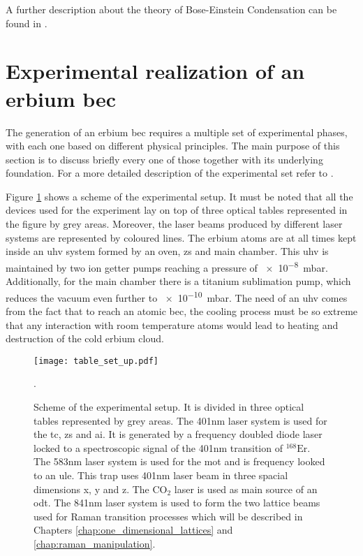 A further description about the theory of Bose-Einstein Condensation can be found in \cite{Masahito2010, Pethick2008}.

\section{Experimental realization of an erbium \ac{bec}} \label{sec:experimental_preparation}

The generation of an erbium \ac{bec} requires a multiple set of experimental phases, with each one based on different physical principles. The main purpose of this section is to discuss briefly every one of those together with its underlying foundation. For a more detailed description of the experimental set refer to  \cite{Ulitzsch2016}. 

Figure \ref{fig:table_set_up} shows a scheme of the experimental setup. It must be noted that all the devices used for the experiment lay on top of three optical tables represented in the figure by grey areas. Moreover, the laser beams produced by different laser systems are represented by coloured lines. The erbium atoms are at all times kept inside an \ac{uhv} system formed by an oven, \ac{zs} and main chamber. This \ac{uhv} is maintained by two ion getter pumps reaching a pressure of \SI{e-8}{\milli\bar}. Additionally, for the main chamber there is a titanium sublimation pump, which reduces the vacuum even further to \SI{e-10}{\milli\bar}. The need of an \ac{uhv} comes from the fact that to reach an atomic \ac{bec}, the cooling process must be so extreme that any interaction with room temperature atoms would lead to heating and destruction of the cold erbium cloud.


\begin{figure}[!htbp]\centering
	\texttt{[image: table\_set\_up.pdf]}
	\caption[Scheme of the experimental setup]{Scheme of the experimental setup. It is divided in three optical tables represented by grey areas. The 401nm laser system is used for the \acf{tc}, \acf{zs} and \acf{ai}. It is generated by a frequency doubled diode laser locked to a spectroscopic signal of the 401nm transition of $^{\text{168}}\text{Er}$. The 583nm laser system is used for the \acf{mot} and is frequency looked to an \acf{ule}. This trap uses 401nm laser beam in three spacial dimensions x, y and z. The $\text{CO}_{2}$ laser is used as main source of an \acf{odt}. The 841nm laser system is used to form the two lattice beams used for Raman transition processes which will be described in Chapters \ref{chap:one_dimensional_lattices} and \ref{chap:raman_manipulation}.}\label{fig:table_set_up}. 
\end{figure}


